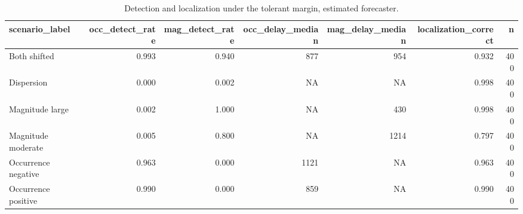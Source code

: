 \begin{table}

\caption{Detection and localization under the tolerant margin, estimated forecaster.}
\centering
\begin{tabular}[t]{lrrrrrr}
\toprule
scenario\_label & occ\_detect\_rate & mag\_detect\_rate & occ\_delay\_median & mag\_delay\_median & localization\_correct & n\\
\midrule
Both shifted & 0.993 & 0.940 & 877 & 954 & 0.932 & 400\\
Dispersion & 0.000 & 0.002 & NA & NA & 0.998 & 400\\
Magnitude large & 0.002 & 1.000 & NA & 430 & 0.998 & 400\\
Magnitude moderate & 0.005 & 0.800 & NA & 1214 & 0.797 & 400\\
Occurrence negative & 0.963 & 0.000 & 1121 & NA & 0.963 & 400\\
\addlinespace
Occurrence positive & 0.990 & 0.000 & 859 & NA & 0.990 & 400\\
\bottomrule
\end{tabular}
\end{table}
